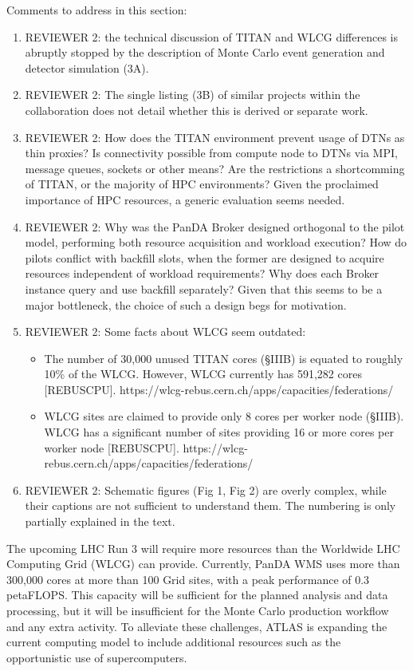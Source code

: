 \ifreview
Comments to address in this section:
\begin{enumerate}
	\color{red} 
	\item REVIEWER 2: the technical discussion of TITAN and WLCG differences
	is abruptly stopped by the description of Monte Carlo event generation
	and detector simulation (3A).
	\item REVIEWER 2: The single listing (3B) of similar projects within the
	collaboration does not detail whether this is derived or separate work.
	\item REVIEWER 2: How does the TITAN environment prevent usage of DTNs as
	thin proxies? Is connectivity possible from compute node to DTNs via MPI,
	message queues, sockets or other means? Are the restrictions a
	shortcomming of TITAN, or the majority of HPC environments? Given the
	proclaimed importance of HPC resources, a generic evaluation seems
	needed.
	\item REVIEWER 2: Why was the PanDA Broker designed orthogonal to the
	pilot model, performing both resource acquisition and workload execution?
	How do pilots conflict with backfill slots, when the former are designed
	to acquire resources independent of workload requirements? Why does each
	Broker instance query and use backfill separately? Given that this seems
	to be a major bottleneck, the choice of such a design begs for
	motivation.
	\item REVIEWER 2: Some facts about WLCG seem outdated:
	\begin{itemize}
		\item The number of 30,000 unused TITAN cores (§IIIB) is equated to
		roughly 10\% of the WLCG. However, WLCG currently has 591,282 cores
		[REBUSCPU]. https://wlcg-rebus.cern.ch/apps/capacities/federations/
		\item WLCG sites are claimed to provide only 8 cores per worker node
		(§IIIB). WLCG has a significant number of sites providing 16 or more
		cores per worker node [REBUSCPU]. https://wlcg-rebus.cern.ch/apps/capacities/federations/
	\end{itemize}
	\item REVIEWER 2: Schematic figures (Fig 1, Fig 2) are overly complex,
	while their captions are not sufficient to understand them. The numbering
	is only partially explained in the text.
\end{enumerate}
\fi

The upcoming LHC Run 3 will require more resources than the Worldwide LHC
Computing Grid (WLCG) can provide. Currently, PanDA WMS uses more than
300,000 cores at more than 100 Grid sites, with a peak performance of 0.3
petaFLOPS\@. This capacity will be sufficient for the planned analysis and
data processing, but it will be insufficient for the Monte Carlo production
workflow and any extra activity. To alleviate these challenges, ATLAS is
expanding the current computing model to include additional resources such as
the opportunistic use of supercomputers.

